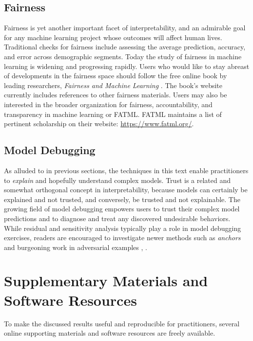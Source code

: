 \documentclass[11pt]{asaproc}
\begin{document}
\subsection{Fairness}

Fairness is yet another important facet of interpretability, and an admirable goal for any machine learning project whose outcomes will affect human lives. Traditional checks for fairness include assessing the average prediction, accuracy, and error across demographic segments. Today the study of fairness in machine learning is widening and progressing rapidly. Users who would like to stay abreast of developments in the fairness space should follow the free online book by leading researchers, \textit{Fairness and Machine Learning} \cite{fairness_book}. The book's website currently includes references to other fairness materials. Users may also be interested in the broader organization for fairness, accountability, and transparency in machine learning or FATML. FATML maintains a list of pertinent scholarship on their website: \url{https://www.fatml.org/}. 

\subsection{Model Debugging}

As alluded to in previous sections, the techniques in this text enable practitioners to \textit{explain} and hopefully understand complex models. Trust is a related and somewhat orthogonal concept in interpretability, because models can certainly be explained and not trusted, and conversely, be trusted and not explainable. The growing field of model debugging empowers users to trust their complex model predictions and to diagnose and treat any discovered undesirable behaviors. While residual and sensitivity analysis typically play a role in model debugging exercises, readers are encouraged to investigate newer methods such as \textit{anchors} and burgeoning work in adversarial examples \cite{anchors}, \cite{adversarial_sameer}. 
 
\section{Supplementary Materials and Software Resources } \label{sec:software}

To make the discussed results useful and reproducible for practitioners, several online supporting materials and software resources are freely available. 
\end{document}
